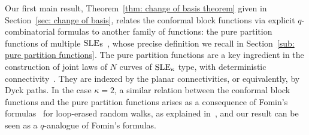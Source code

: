 \documentclass[oneside,english]{amsart}
\numberwithin{equation}{section}
\numberwithin{figure}{section}
\theoremstyle{plain}
\theoremstyle{plain}
\theoremstyle{plain}
\theoremstyle{remark}
\theoremstyle{plain}
\theoremstyle{plain}
\theoremstyle{plain}
\theoremstyle{plain}
\theoremstyle{plain}
\theoremstyle{plain}
\theoremstyle{plain}
\theoremstyle{plain}
\newcommand{\alexmod}[1]{{\color{allucol} #1}}
\newcommand{\blue}[1]{{\color{blue} #1}}
\begin{document}
Our first main result, Theorem~\ref{thm: change of basis theorem} given in Section~\ref{sec: change of basis}, %
relates the conformal block functions via explicit $q$-combinatorial formulas to
another family of functions: the pure partition functions of multiple $\mathrm{SLE}$s~\cite{KP-pure_partition_functions_of_multiple_SLEs},
whose precise definition we recall in Section~\ref{sub: pure partition functions}.
The pure partition functions are a key ingredient in the construction of joint laws of $N$
curves of $\mathrm{SLE}_{\kappa}$ type, with deterministic
connectivity~\cite{BBK-multiple_SLEs, KP-pure_partition_functions_of_multiple_SLEs,
KKP-boundary_correlations_in_planar_LERW_and_UST, PH-Global_multiple_SLEs_and_pure_partition_functions}.
They are indexed by the planar connectivities, or equivalently, %
by Dyck paths.
In the case $\kappa = 2$, 
a similar relation between the conformal block functions and the pure partition
functions arises as a consequence of Fomin's formulas~\cite{Fomin-LERW_and_total_positivity}
for loop-erased random walks, as explained in~\cite{KKP-boundary_correlations_in_planar_LERW_and_UST},
and our result can be seen as a $q$-analogue of Fomin's formulas.
\end{document}
